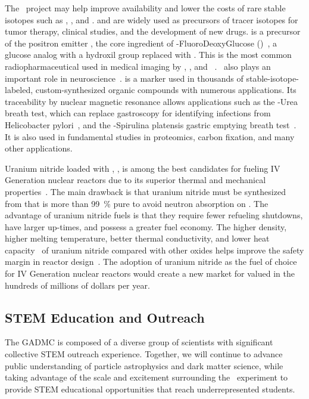The \Aria\ project may help improve availability and lower the costs of rare stable isotopes such as , , and .   and  are widely used as precursors of tracer isotopes for tumor therapy, clinical studies, and the development of new drugs.   is a precursor of the positron emitter , the core ingredient of -FluoroDeoxyGlucose (\FDG)~\cite{Pacak:1969cf}, a glucose analog with a hydroxil group replaced with .  This is the most common radiopharmaceutical used in medical imaging by \PET, \TOFPET, and \PETCT~\cite{Som:1980vv,Kelloff:2005hm}.  \FDG\ also plays an important role in neuroscience~\cite{Newberg:2002hq}.   is a marker used in thousands of stable-isotope-labeled, custom-synthesized organic compounds with numerous applications.  Its traceability by nuclear magnetic resonance allows applications such as the -Urea breath test, which can replace gastroscopy for identifying infections from Helicobacter pylori~\cite{Graham:1987cy}, and the -Spirulina platensis gastric emptying breath test~\cite{Bharucha:2012eu}.  It is also used in fundamental studies in proteomics, carbon fixation, and many other applications.

Uranium nitride loaded with , , is among the best candidates for  fueling IV Generation nuclear reactors due to its superior thermal and mechanical properties~\cite{Zakova:2012dy,Youinou:2014dv,Jaques:2015cw}.  The main drawback is that uranium nitride must be synthesized from  that is more than \SI{99}{\percent} pure to avoid neutron absorption on . The  advantage of  uranium nitride fuels is that they require fewer refueling shutdowns, have larger up-times, and possess a greater fuel economy. The  higher density, higher melting temperature, better thermal conductivity, and lower heat capacity~\cite{Hayes:1990hz,Hayes:1990go} of uranium nitride compared with other oxides helps improve the safety margin in reactor design~\cite{Zhao:2014ia}.  The adoption of uranium nitride as the fuel of choice for IV Generation nuclear reactors would create a new market for  valued in the hundreds of millions of dollars per year.


\subsection{STEM Education and Outreach}

The GADMC is composed of a diverse group of scientists with significant collective STEM outreach experience. Together, we will continue to advance public understanding of particle astrophysics and dark matter science, while taking advantage of the scale and excitement surrounding the \DSks\ experiment to provide STEM educational opportunities that reach underrepresented students.

